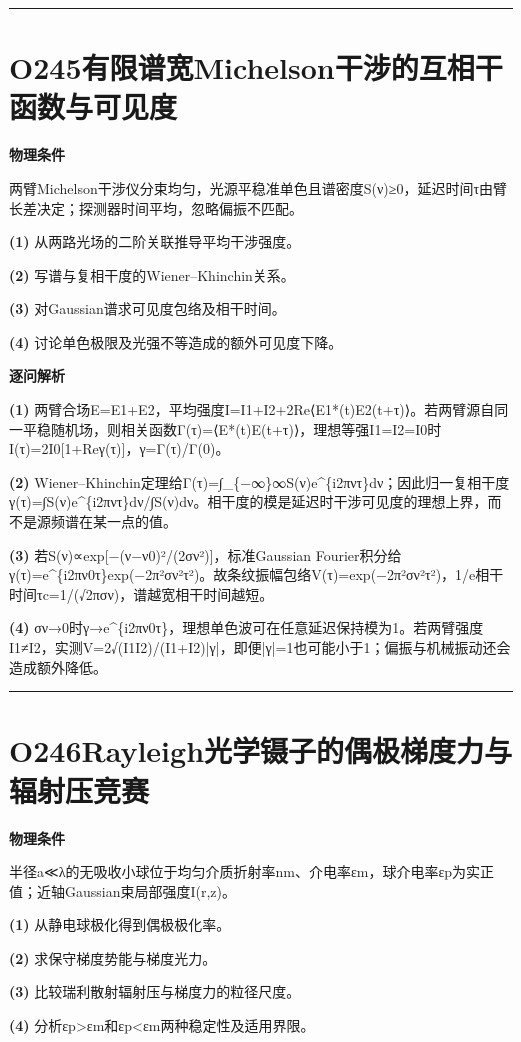 \documentclass[UTF8,a4paper,11pt,oneside,openany]{ctexbook}
\begin{document}
\par\bigskip\hrule\bigskip
\section*{O245\quad 有限谱宽Michelson干涉的互相干函数与可见度}
\textbf{物理条件}\par 两臂Michelson干涉仪分束均匀，光源平稳准单色且谱密度S(ν)≥0，延迟时间τ由臂长差决定；探测器时间平均，忽略偏振不匹配。
\par\noindent\textbf{(1)} 从两路光场的二阶关联推导平均干涉强度。
\par\noindent\textbf{(2)} 写谱与复相干度的Wiener–Khinchin关系。
\par\noindent\textbf{(3)} 对Gaussian谱求可见度包络及相干时间。
\par\noindent\textbf{(4)} 讨论单色极限及光强不等造成的额外可见度下降。

\par\medskip\noindent\textbf{逐问解析}
\par\noindent\textbf{(1)} 两臂合场E=E1+E2，平均强度I=I1+I2+2Re⟨E1*(t)E2(t+τ)⟩。若两臂源自同一平稳随机场，则相关函数Γ(τ)=⟨E*(t)E(t+τ)⟩，理想等强I1=I2=I0时I(τ)=2I0[1+Reγ(τ)]，γ=Γ(τ)/Γ(0)。
\par\noindent\textbf{(2)} Wiener–Khinchin定理给Γ(τ)=∫\_\{−∞\}∞S(ν)e\textasciicircum{}\{i2πντ\}dν；因此归一复相干度γ(τ)=∫S(ν)e\textasciicircum{}\{i2πντ\}dν/∫S(ν)dν。相干度的模是延迟时干涉可见度的理想上界，而不是源频谱在某一点的值。
\par\noindent\textbf{(3)} 若S(ν)∝exp[−(ν−ν0)²/(2σν²)]，标准Gaussian Fourier积分给γ(τ)=e\textasciicircum{}\{i2πν0τ\}exp(−2π²σν²τ²)。故条纹振幅包络V(τ)=exp(−2π²σν²τ²)，1/e相干时间τc=1/(√2πσν)，谱越宽相干时间越短。
\par\noindent\textbf{(4)} σν→0时γ→e\textasciicircum{}\{i2πν0τ\}，理想单色波可在任意延迟保持模为1。若两臂强度I1≠I2，实测V=2√(I1I2)/(I1+I2)|γ|，即便|γ|=1也可能小于1；偏振与机械振动还会造成额外降低。

\par\bigskip\hrule\bigskip
\section*{O246\quad Rayleigh光学镊子的偶极梯度力与辐射压竞赛}
\textbf{物理条件}\par 半径a≪λ的无吸收小球位于均匀介质折射率nm、介电率εm，球介电率εp为实正值；近轴Gaussian束局部强度I(r,z)。
\par\noindent\textbf{(1)} 从静电球极化得到偶极极化率。
\par\noindent\textbf{(2)} 求保守梯度势能与梯度光力。
\par\noindent\textbf{(3)} 比较瑞利散射辐射压与梯度力的粒径尺度。
\par\noindent\textbf{(4)} 分析εp>εm和εp<εm两种稳定性及适用界限。
\end{document}
